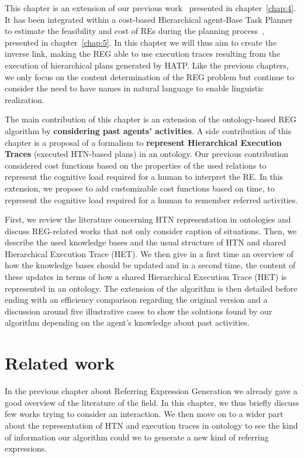 This chapter is an extension of our previous work~\cite{buisan_2020_efficient} presented in chapter~\ref{chap:4}. It has been integrated within a cost-based Hierarchical agent-Base Task Planner to estimate the feasibility and cost of REs during the planning process~\cite{buisan_2020_human}, presented in chapter~\ref{chap:5}. In this chapter we will thus aim to create the inverse link, making the REG able to use execution traces resulting from the execution of hierarchical plans generated by HATP. Like the previous chapters, we only focus on the content determination of the REG problem but continue to consider the need to have names in natural language to enable linguistic realization.

The main contribution of this chapter is an extension of the ontology-based REG algorithm by \textbf{considering past agents' activities}. A side contribution of this chapter is a proposal of a formalism to \textbf{represent Hierarchical Execution Traces} (executed HTN-based plans) in an ontology. Our previous contribution considered cost functions based on the properties of the used relations to represent the cognitive load required for a human to interpret the RE. In this extension, we propose to add customizable cost functions based on time, to represent the cognitive load required for a human to remember referred activities.

First, we review the literature concerning HTN representation in ontologies and discuss REG-related works that not only consider caption of situations. Then, we describe the used knowledge bases and the usual structure of HTN and shared Hierarchical Execution Trace (HET). We then give in a first time an overview of how the knowledge bases should be updated and in a second time, the content of these updates in terms of how a shared Hierarchical Execution Trace (HET) is represented in an ontology. The extension of the algorithm is then detailed before ending with an efficiency comparison regarding the original version and a discussion around five illustrative cases to show the solutions found by our algorithm depending on the agent's knowledge about past activities.

\section{Related work}

In the previous chapter about Referring Expression Generation we already gave a good overview of the literature of the field. In this chapter, we thus briefly discuss few works trying to consider an interaction. We then move on to a wider part about the representation of HTN and execution traces in ontology to see the kind of information our algorithm could we to generate a new kind of referring expressions.

